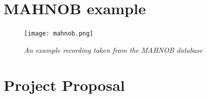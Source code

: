 \documentclass[12pt,twoside,notitlepage]{report}
\begin{document}
\begin{appendices}
\chapter{MAHNOB example}
\begin{figure}[H]
    \centering
    \texttt{[image: mahnob.png]}
    \caption{\textit{An example recording taken from the MAHNOB \cite{Mahnob} database} }
\end{figure}


\cleardoublepage
\chapter{Project Proposal}

\end{appendices}
% 
\end{document}
